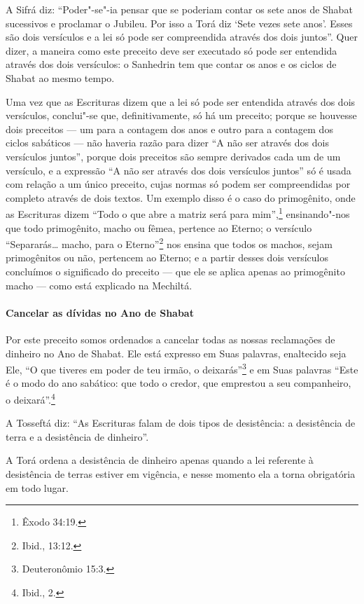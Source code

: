 \begin{multicols}{2}
A Sifrá\starr{} diz: ``Poder"-se"-ia pensar que se poderiam contar os sete anos de
Shabat sucessivos e proclamar o Jubileu. Por isso a Torá\starr{} diz `Sete
vezes sete anos'. Esses são dois versículos e a lei só pode ser
compreendida através dos dois juntos''. Quer dizer, a maneira como este
preceito deve ser executado só pode ser entendida através dos dois
versículos: o Sanhedrin\starr{} tem que contar os anos e os ciclos de Shabat ao
mesmo tempo.

Uma vez que as Escrituras dizem que a lei só pode ser entendida através
dos dois versículos, conclui"-se que, definitivamente, só há um preceito;
porque se houvesse dois preceitos --- um para a contagem dos anos e
outro para a contagem dos ciclos sabáticos --- não haveria razão para
dizer ``A não ser através dos dois versículos juntos'', porque dois
preceitos são sempre derivados cada um de um versículo, e a expressão
``A não ser através dos dois versículos juntos'' só é usada com relação
a um único preceito, cujas normas só podem
ser compreendidas por completo através de dois textos. Um exemplo disso
é o caso do primogênito, onde as Escrituras dizem ``Todo o que abre a
matriz será para mim'',\footnote{Êxodo 34:19.} ensinando"-nos que todo
primogênito, macho ou fêmea, pertence ao Eterno; o versículo
``Separarás\ldots{} macho, para o Eterno''\footnote{Ibid., 13:12.} nos ensina que
todos os machos, sejam primogênitos ou não, pertencem ao Eterno; e a
partir desses dois versículos concluímos o significado do preceito ---
que ele se aplica apenas ao primogênito macho --- como está explicado na
Mechiltá\starr.

\paragraph{Cancelar as dívidas no Ano de Shabat}

Por este preceito somos ordenados a cancelar todas as nossas
reclamações de dinheiro no Ano de Shabat. Ele está expresso em Suas
palavras, enaltecido seja Ele, ``O que tiveres em poder de teu irmão, o
deixarás''\footnote{Deuteronômio 15:3.} e em Suas palavras ``Este é o modo do
ano sabático: que todo o credor, que emprestou a seu companheiro, o
deixará''.\footnote{Ibid., 2.}

A Tosseftá\starr{} diz: ``As Escrituras falam de dois tipos de desistência: a
desistência de terra e a desistência de dinheiro''.

A Torá\starr{} ordena a desistência de dinheiro apenas quando a lei referente
à desistência de terras estiver em vigência, e nesse momento ela a torna
obrigatória em todo lugar.


\end{multicols}
